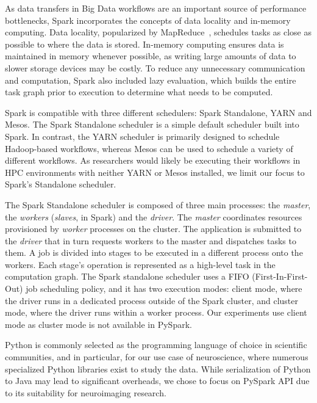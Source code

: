 \documentclass[conference]{IEEEtran}
\begin{document}
As data transfers in Big Data workflows are an important source of performance
bottlenecks, Spark incorporates the concepts of data locality and in-memory
computing. Data locality, popularized by MapReduce~\cite{dean2008mapreduce},
schedules tasks as close as possible to where the data is stored. In-memory computing
ensures data is maintained in memory whenever possible, as writing large amounts of
data to slower storage devices may be costly. To reduce any unnecessary communication
and computation, Spark also included lazy evaluation, which builds the entire task
graph prior to execution to determine what needs to be computed.

Spark is compatible with three different schedulers: Spark
Standalone, YARN and Mesos.
The Spark Standalone scheduler is a simple default scheduler built into Spark.
In contrast, the YARN scheduler is primarily designed to schedule Hadoop-based 
workflows, whereas Mesos can be used to schedule
a variety of different workflows. As researchers would likely be
executing their workflows in HPC environments with neither YARN or Mesos
installed, we limit our focus to Spark's Standalone scheduler.


The Spark Standalone scheduler is composed of three main processes: the
\emph{master}, the \emph{workers} (\emph{slaves}, in Spark) and the
\emph{driver}. The \emph{master} coordinates resources provisioned by
\emph{worker} processes on the cluster. The application is submitted to the
\emph{driver} that in turn requests workers to the master and dispatches tasks
to them. A job is divided into stages to be executed in a different process onto
the workers. Each stage's operation is represented as a high-level task in the
computation graph. The Spark standalone scheduler uses a FIFO 
(First-In-First-Out) job scheduling policy, and it has
two execution modes: client mode, where the driver runs in a dedicated process
outside of the Spark cluster, and cluster mode, where the driver runs within
a worker process. Our experiments use client mode as cluster mode is not
available in PySpark. 


Python is commonly selected as the programming language of choice in scientific
communities, and in particular, for our use case of neuroscience, where
numerous specialized Python libraries exist to study the data.
While serialization of Python to Java may lead to significant overheads, we
chose to focus on PySpark API due to its suitability for neuroimaging
research. 
\end{document}

